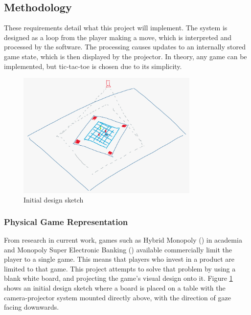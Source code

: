 \documentclass[12pt]{article}
\begin{document}
\subsection{Methodology}
These requirements detail what this project will implement. 
The system is designed as a loop from the player making a move, which is interpreted and processed by the software. 
The processing causes updates to an internally stored game state, which is then displayed by the projector. 
In theory, any game can be implemented, but tic-tac-toe is chosen due to its simplicity. 

\begin{figure}[h]
    \centering
    \includegraphics[width=0.8\textwidth]{images/figures/fig3}
    \caption{Initial design sketch}
    \label{fig:designsketch}
\end{figure}

\subsubsection{Physical Game Representation}
From research in current work, games such as Hybrid Monopoly (\cite{park2017hybrid}) in academia and Monopoly Super Electronic Banking (\cite{monopolyelectronic}) available commercially limit the player to a single game. 
This means that players who invest in a product are limited to that game. This project attempts to solve that problem by using a blank white board, and projecting the game's visual design onto it. 
Figure \ref{fig:designsketch} shows an initial design sketch where a board is placed on a table with the camera-projector system mounted directly above, with the direction of gaze facing downwards.
\end{document}
